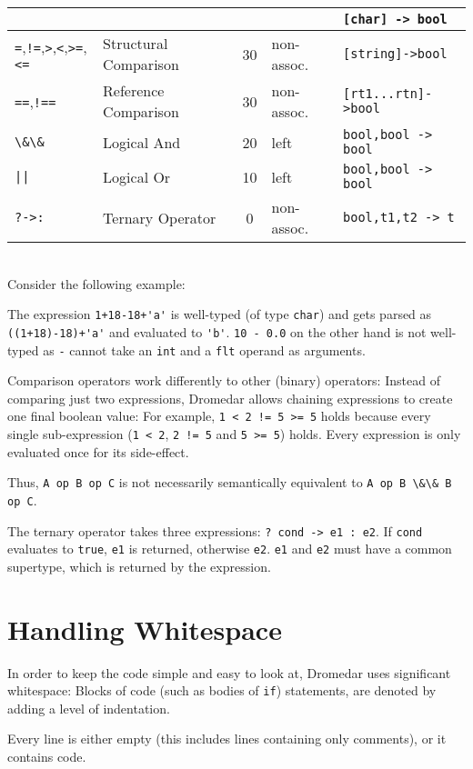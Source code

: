 \documentclass{article}
\newcommand{\code}[1]{\lstinline[columns=fixed]{#1}}
\begin{document}
\begin{tabular}{l|l|c|l|l}
				&&&& \code{[char] -> bool}\\
			\midrule
			\code{=},\code{!=},\code{>},\code{<},\code{>=},\code{<=} & Structural Comparison & 30 & non-assoc. & \code{[string]->bool} \\
			\midrule
			\code{==},\code{!==} & Reference Comparison & 30 & non-assoc. & \code{[rt1...rtn]->bool}\\
			\midrule
			\code{\&\&} & Logical And & 20 & left & \code{bool,bool -> bool}\\
			\midrule
			\code{||} & Logical Or & 10 & left & \code{bool,bool -> bool}\\
			\midrule
			\code{?->:} & Ternary Operator & 0 & non-assoc. & \code{bool,t1,t2 -> t}
		\end{tabular}\\
	
		Consider the following example:
		
		The expression \code{1+18-18+'a'} is well-typed (of type \code{char}) and gets parsed as \code{((1+18)-18)+'a'} and evaluated to \code{'b'}. \code{10 - 0.0} on the other hand is not well-typed as \code{-} cannot take an \code{int} and a \code{flt} operand as arguments.
		
		Comparison operators work differently to other (binary) operators: Instead of comparing just two expressions, Dromedar allows chaining expressions to create one final boolean value: For example, \code{1 < 2 != 5 >= 5} holds because every single sub-expression (\code{1 < 2}, \code{2 != 5} and \code{5 >= 5}) holds. Every expression is only evaluated once for its side-effect.
		
		Thus, \code{A op B op C} is not necessarily semantically equivalent to \code{A op B \&\& B op C}.
		
		The ternary operator takes three expressions: \code{? cond -> e1 : e2}. If \code{cond} evaluates to \code{true}, \code{e1} is returned, otherwise \code{e2}. \code{e1} and \code{e2} must have a common supertype, which is returned by the expression.
		
	\section{Handling Whitespace}
	
		In order to keep the code simple and easy to look at, Dromedar uses significant whitespace: Blocks of code (such as bodies of \code{if}) statements, are denoted by adding a level of indentation.
		
		Every line is either empty (this includes lines containing only comments), or it contains code. 
		
\end{document}
